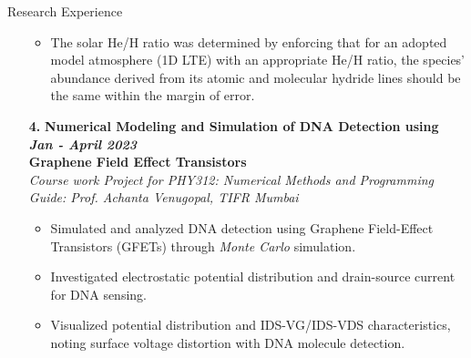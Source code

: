 \documentclass{resume} %
\begin{document}
\begin{rSection}{Research Experience}
\begin{enumerate}
\begin{itemize}
        \item The solar He/H ratio was determined by enforcing that for an adopted model atmosphere (1D LTE) with an appropriate He/H ratio, the species' abundance derived from its atomic and molecular hydride lines should be the same within the margin of error.
    \end{itemize}
\vspace{0.3cm}
    \item[\textbf{4.}] {\bf Numerical Modeling and Simulation of DNA Detection using \hfill {\em \bf Jan - April 2023}\\Graphene Field Effect Transistors} \\
    \textit{Course work Project for PHY312: Numerical Methods and Programming\\Guide: Prof. Achanta Venugopal, TIFR Mumbai}
    \begin{itemize}
    \itemsep -5pt
        \item Simulated and analyzed DNA detection using Graphene Field-Effect Transistors (GFETs) through \textit{Monte Carlo} simulation.
        \item Investigated electrostatic potential distribution and drain-source current for DNA sensing.
        \item Visualized potential distribution and IDS-VG/IDS-VDS characteristics, noting surface voltage distortion with DNA molecule detection.
        

\end{itemize}
\end{enumerate}
\end{rSection}
\end{document}
